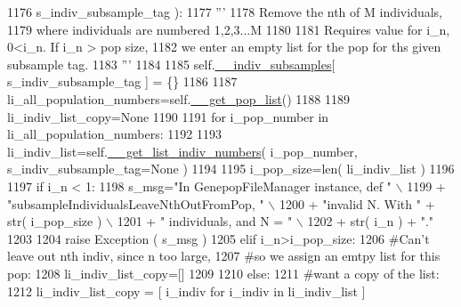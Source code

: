\begin{DoxyCode}
1176                                                     s\_indiv\_subsample\_tag ):
1177         \textcolor{stringliteral}{'''}
1178 \textcolor{stringliteral}{        Remove the nth of M individuals, }
1179 \textcolor{stringliteral}{        where individuals are numbered 1,2,3...M}
1180 \textcolor{stringliteral}{}
1181 \textcolor{stringliteral}{        Requires value for i\_n, 0<i\_n.  If i\_n > pop size,}
1182 \textcolor{stringliteral}{        we enter an empty list for the pop for ths given subsample tag.}
1183 \textcolor{stringliteral}{        '''}
1184 
1185         self.\hyperlink{classnegui_1_1genepopfilemanager_1_1GenepopFileManager_a1e8379bcee4902ca9314ff53fcb71644}{\_\_indiv\_subsamples}[ s\_indiv\_subsample\_tag ] = \{\}
1186 
1187         li\_all\_population\_numbers=self.\hyperlink{classnegui_1_1genepopfilemanager_1_1GenepopFileManager_a0cd3178624c652968b4d319f12e5df6e}{\_\_get\_pop\_list}()
1188         
1189         li\_indiv\_list\_copy=\textcolor{keywordtype}{None}
1190 
1191         \textcolor{keywordflow}{for} i\_pop\_number \textcolor{keywordflow}{in} li\_all\_population\_numbers:
1192 
1193             li\_indiv\_list=self.\hyperlink{classnegui_1_1genepopfilemanager_1_1GenepopFileManager_a4615769e9db90aa477aa3fd865408f54}{\_\_get\_list\_indiv\_numbers}( i\_pop\_number, 
      s\_indiv\_subsample\_tag=\textcolor{keywordtype}{None} )
1194 
1195             i\_pop\_size=len( li\_indiv\_list )
1196 
1197             \textcolor{keywordflow}{if}  i\_n < 1:
1198                 s\_msg=\textcolor{stringliteral}{"In GenepopFileManager instance, def "} \(\backslash\)
1199                         + \textcolor{stringliteral}{"subsampleIndividualsLeaveNthOutFromPop, "} \(\backslash\)
1200                         + \textcolor{stringliteral}{"invalid N.  With "} + str( i\_pop\_size ) \(\backslash\)
1201                         + \textcolor{stringliteral}{" individuals, and N = "} \(\backslash\)
1202                         + str( i\_n ) + \textcolor{stringliteral}{"."}
1203 
1204                 \textcolor{keywordflow}{raise} Exception ( s\_msg )
1205             \textcolor{keywordflow}{elif} i\_n>i\_pop\_size:
1206                 \textcolor{comment}{#Can't leave out nth indiv, since n too large,}
1207                 \textcolor{comment}{#so we assign an emtpy list for this pop:}
1208                 li\_indiv\_list\_copy=[]
1209 
1210             \textcolor{keywordflow}{else}:   
1211                 \textcolor{comment}{#want a copy of the list:}
1212                 li\_indiv\_list\_copy = [ i\_indiv \textcolor{keywordflow}{for} i\_indiv \textcolor{keywordflow}{in} li\_indiv\_list ]

\end{DoxyCode}
